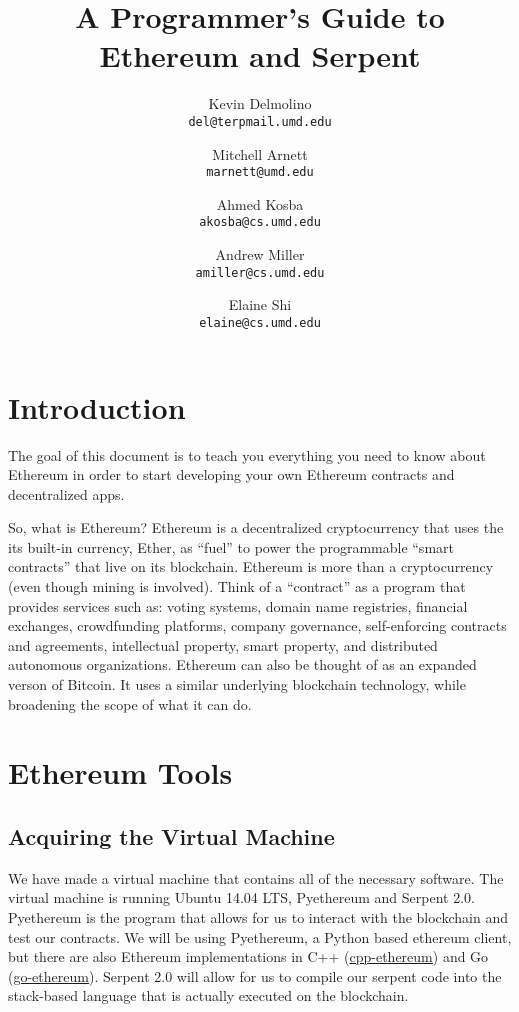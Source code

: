 \documentclass[12pt]{article}
\begin{document}
\title{A Programmer's Guide to Ethereum and Serpent}

\author{
  Kevin Delmolino\\
  \texttt{del@terpmail.umd.edu}
  \and
  Mitchell Arnett\\
  \texttt{marnett@umd.edu}
  \and
  Ahmed Kosba\\
  \texttt{akosba@cs.umd.edu}
  \and
  Andrew Miller\\
  \texttt{amiller@cs.umd.edu}
  \and
  Elaine Shi\\
  \texttt{elaine@cs.umd.edu}
}

\maketitle

\setcounter{tocdepth}{5}
\tableofcontents

\section{Introduction}
The goal of this document is to teach you everything you need to know about Ethereum in order to start developing your own Ethereum contracts and decentralized apps.

So, what is Ethereum? Ethereum is a decentralized cryptocurrency that uses the its built-in currency, Ether, as ``fuel'' to power the programmable ``smart contracts'' that live on its blockchain. Ethereum is more than a cryptocurrency (even though mining is involved). Think of a ``contract'' as a program that provides services such as: voting systems, domain name registries, financial exchanges, crowdfunding platforms, company governance, self-enforcing contracts and agreements, intellectual property, smart property, and distributed autonomous organizations. Ethereum can also be thought of as an expanded verson of Bitcoin. It uses a similar underlying blockchain technology, while broadening the scope of what it can do. \cite{Shi2015,EthereumWhitePaper}

\section{Ethereum Tools}
\subsection{Acquiring the Virtual Machine}
We have made a virtual machine that contains all of the necessary software. The virtual machine is running Ubuntu 14.04 LTS, Pyethereum and Serpent 2.0. Pyethereum is the program that allows for us to interact with the blockchain and test our contracts. We will be using Pyethereum, a Python based ethereum client, but there are also Ethereum implementations in C++ (\href{https://github.com/ethereum/cpp-ethereum}{cpp-ethereum}) and Go (\href{https://github.com/ethereum/go-ethereum}{go-ethereum}). Serpent 2.0 will allow for us to compile our serpent code into the stack-based language that is actually executed on the blockchain. 
\end{document}
